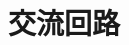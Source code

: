 \documentclass[../../../all/physics-standard_questions_all.tex]{subfiles}
\begin{document}
\section{交流回路}
\end{document}
